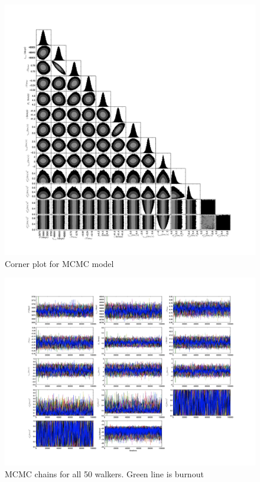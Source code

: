 \documentclass{article}
\begin{document}
\begin{figure}[!htb]
\centering
\includegraphics[width=\textwidth]{corner_100000.jpg}
\caption{Corner plot for MCMC model}
\end{figure}

\begin{figure}[!htb]
\centering
\includegraphics[width=\textwidth]{chainPlot_100000.jpg}
\caption{MCMC chains for all 50 walkers. Green line is burnout}
\end{figure}
\end{document}
